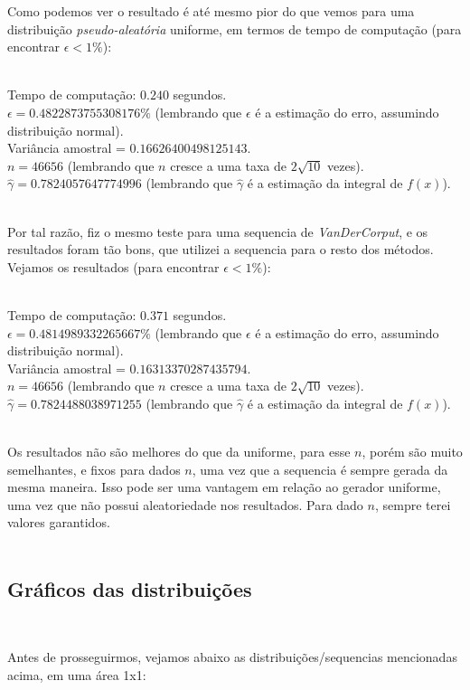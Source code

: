 \documentclass[pt12]{article}
\begin{document}
Como podemos ver o resultado é até mesmo pior do que vemos para uma distribuição \textit{pseudo-aleatória} uniforme, em termos de tempo de computação (para encontrar $\epsilon <1\%$):\\
\ 

\noindent Tempo de computação: $0.240$ segundos.\\
\noindent $\epsilon = 0.4822873755308176\%$ (lembrando que $\epsilon$ é a estimação do erro, assumindo distribuição normal).\\
\noindent Variância amostral = $0.16626400498125143$.\\
\noindent $n = 46656$ (lembrando que $n$ cresce a uma taxa de $2\sqrt{10}$ vezes).\\
\noindent $\hat{\gamma} = 0.7824057647774996$ (lembrando que $\hat{\gamma}$ é a estimação da integral de $f(x)$).\\
\ 

Por tal razão, fiz o mesmo teste para uma sequencia de \textit{VanDerCorput}, e os resultados foram tão bons, que utilizei a sequencia para o resto dos métodos. Vejamos os resultados (para encontrar $\epsilon <1\%$):\\
\ 

\noindent Tempo de computação: $0.371$ segundos.\\
\noindent $\epsilon = 0.4814989332265667\%$ (lembrando que $\epsilon$ é a estimação do erro, assumindo distribuição normal).\\
\noindent Variância amostral = $0.16313370287435794$.\\
\noindent $n = 46656$ (lembrando que $n$ cresce a uma taxa de $2\sqrt{10}$ vezes).\\
\noindent $\hat{\gamma} = 0.7824488038971255$ (lembrando que $\hat{\gamma}$ é a estimação da integral de $f(x)$).\\
\ 

Os resultados não são melhores do que da uniforme, para esse $n$, porém são muito semelhantes, e fixos para dados $n$, uma vez que a sequencia é sempre gerada da mesma maneira. Isso pode ser uma vantagem em relação ao gerador uniforme, uma vez que não possui aleatoriedade nos resultados. Para dado $n$, sempre terei valores garantidos.\\
\ 

\subsection{Gráficos das distribuições}
\ 

Antes de prosseguirmos, vejamos abaixo as distribuições/sequencias mencionadas acima, em uma área 1x1:\\
\ 
\end{document}
